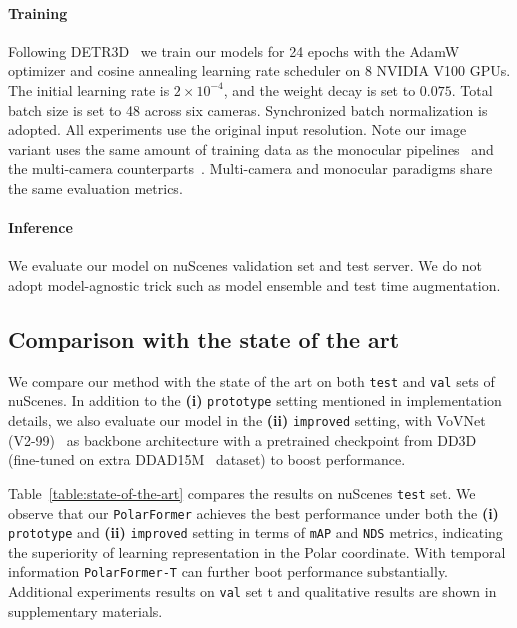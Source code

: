 \documentclass[letterpaper]{article} \usepackage{aaai23}  \usepackage{times}  \usepackage{helvet}  \usepackage{courier}  \usepackage[hyphens]{url}  \usepackage{graphicx} \urlstyle{rm} \def\UrlFont{\rm}  \usepackage{natbib}  \usepackage{caption} \frenchspacing  \setlength{\pdfpagewidth}{8.5in} \setlength{\pdfpageheight}{11in} \usepackage{algorithm}
\begin{document}
\paragraph{Training }
Following DETR3D~\cite{wang2022detr3d} we train our models for 24 epochs with the AdamW optimizer and cosine annealing learning rate scheduler on 8 NVIDIA V100 GPUs.
The initial learning rate is $2 \times 10^{-4}$, and the weight decay is set to $0.075$. 
Total batch size is set to 48 across six cameras.
Synchronized batch normalization is adopted.
All experiments use the original input resolution.
Note our image variant uses the same amount of training data as the monocular pipelines~\cite{wang2021fcos3d} and the multi-camera counterparts~\cite{wang2022detr3d,li2022bevformer}.
Multi-camera and monocular paradigms share the same evaluation metrics.



\paragraph{Inference } 
We evaluate our model on nuScenes validation set and test server.
We do not adopt model-agnostic trick such as model ensemble and test time augmentation.

\subsection{Comparison with the state of the art}

We compare our method with the state of the art on both \texttt{test} and \texttt{val} sets of nuScenes. 
In addition to the 
{\bf (i)} 
\texttt{prototype} setting mentioned in implementation details,
we also evaluate our model in the
{\bf (ii)}
\texttt{improved} setting, with VoVNet (V2-99)~\cite{lee2019energy} as backbone architecture with a pretrained checkpoint from DD3D~\cite{park2021dd3d} (fine-tuned on extra DDAD15M~\cite{packnet} dataset) to boost performance.

Table~\ref{table:state-of-the-art} compares the results on nuScenes \texttt{test} set.
We observe that our \texttt{PolarFormer} achieves the best performance under both the 
{\bf (i)}
\texttt{prototype} and
{\bf (ii)}
\texttt{improved} setting
{
in terms of \texttt{mAP} and \texttt{NDS} metrics, indicating the superiority of learning representation in the Polar coordinate. 
}
With temporal information \texttt{PolarFormer-T} can further boot performance substantially. 
Additional experiments results on \texttt{val} set t and qualitative
results are shown in supplementary materials.
\end{document}
